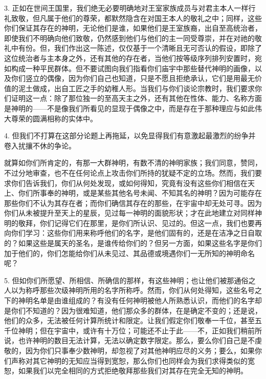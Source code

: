 3. 正如在世间王国里，我们绝无必要明确地对王室家族成员与对君主本人一样行礼致敬，但凡属于他们的尊荣，都默然隐含在对国王本人的敬礼之中；同样，这些你们保证其存在的神明，无论他们是谁，如果他们是王室族裔，出自至高统治者，即使我们不明确向他们致敬，仍然感到他们与他们的主一同受尊崇，并在对祂的敬礼中有份。但，我们作出这一陈述，仅仅基于一个清晰且无可否认的假设，即除了这位统治者与主本身之外，还有其他的存在者，当他们按等级序列排列安置时，宛如构成一种平民群体。但不要试图向我们指看你们庙宇中那些替代神明的画像，以及你们竖立的偶像，因为你们自己也知道，只是不愿且拒绝承认，它们是用最无价值的泥土做成，出自工匠之手的幼稚人形。当我们与你们谈论宗教时，我们要求你们证明这一点：除了那位独一的至高天主之外，还有其他在性体、能力、名称方面是神明的——不是像我们所看见的显现于偶像之中，而是存在于那种理应与如此伟大尊荣的圆满相称的实体中。\par

4. 但我们不打算在这部分论题上再拖延，以免显得我们有意激起最激烈的纷争并卷入扰攘不休的争论。\par

就算如你们所肯定的，有那一大群神明，有数不清的神明家族；我们同意，赞同，不过分地审查，也不在任何论点上攻击你们所持的犹疑不定的立场。然而，我们要求你们告诉我们，你们从何处发现，或如何得知，究竟有没有这些你们相信在天上、你们所事奉的神明，或是某些其他名号未闻、不知其名的神明？因为可能存在那些你们不认为其存在者；而你们确信其存在的那些，在宇宙中却无处可寻。因为你们从未被提升至天上的星辰，见过每一神明的面貌形状；才在此地建立对同样神明的敬拜，你们记得它们在那里，是你们所认识、见过的。但这一点，我们也要再向你们学习：这些你们用来称呼他们的名字，是他们固有的，还是在洁净之日自取的？如果这些是属天的圣名，是谁传给你们的？但另一方面，如果这些名字是你们加于他们的，你们怎能给你们从未见过、其品德或境遇你们一无所知的神明命名呢？\par

5. 但如你们所愿望、所相信、所确信的那样，有这些神明；也让他们被那通俗之人以为称呼那些次级神明所用的名字所称呼。然而，你们从何处得知，这些名号之下的神明名单是由谁组成的？有没有任何神明被他人所熟悉认识，而他们的名字却是你们不知道的？因为很难知道，他们那众多的群体，在是确定不变的；还是说，他们的众多，无法被任何计算所统计和限定。让我们假定你们敬奉一千位，甚至五千位神明；但在宇宙中，或许有十万位；可能还不止于此——不，正如我们稍前所说，也许神明的数目无法计算，无法以确定数字限定。那么，要么你们自己是不虔敬的，因为你们只事奉少数神明，却忽视了对其他神明应尽的义务；要么，如果你们声称对其它神明的无知应当得到宽恕，那么你们也同样会为我们求得类似的宽恕，如果我们以完全相同的方式拒绝敬拜那些我们对其存在完全无知的神明。\par

